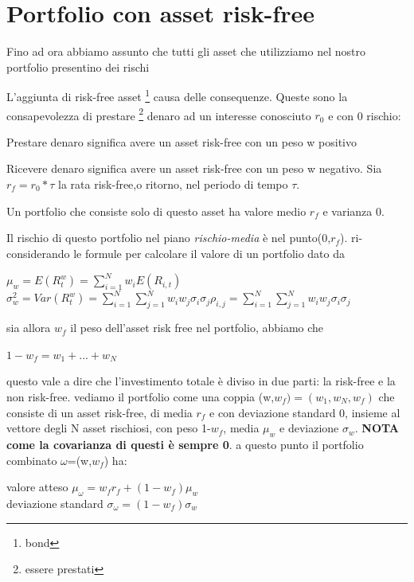 \documentclass[a4paper,11pt]{report}
\begin{document}
{%
\section{Portfolio con asset risk-free}
	Fino ad ora abbiamo assunto che tutti gli asset che utilizziamo nel nostro portfolio presentino dei rischi

	L'aggiunta di risk-free asset \footnote{bond} causa delle consequenze.
	Queste sono la consapevolezza di prestare \footnote{essere prestati} denaro ad un interesse conosciuto $r_0$ e con 0 rischio:
	
	Prestare denaro significa avere un asset risk-free con un peso w positivo

	Ricevere denaro significa avere un asset risk-free con un peso w negativo. \newline
	Sia $r_f=r_0* \tau$ la rata risk-free,o ritorno, nel periodo di tempo $\tau$.

	Un portfolio che consiste solo di questo asset ha valore medio $r_f$ e varianza 0.

	Il rischio di questo portfolio nel piano \emph{rischio-media} è nel punto(0,$r_f$).
	ri-considerando le formule per calcolare il valore di un portfolio dato da
\begin{center}
	$\mu_w = E(R_t^w) =  \sum\limits_{i=1}^N w_i E(R_{i,t}) $ 
	$\sigma_w^2 = Var(R_t^w) =  \sum\limits_{i=1}^N  \sum\limits_{j=1}^N w_i w_j \sigma_i \sigma_j \rho_{i,j} =  \sum		\limits_{i=1}^N  \sum\limits_{j=1}^N w_i w_j \sigma_i \sigma_j  $ 
\end{center}
	sia allora $w_f$ il peso dell'asset risk free nel portfolio, abbiamo che
\begin{center}
$	1-w_f=w_1+...+w_N$
\end{center}
	questo vale a dire che l'investimento totale è diviso in due parti: la risk-free e la non risk-free.
	vediamo il portfolio come una coppia (w,$w_f)=(w_1,w_N,w_f) $ che consiste di un asset risk-free, di media $r_f$
	e con deviazione standard 0, insieme al vettore degli N asset rischiosi, con peso 1-$w_f$, media $\mu_w$ e deviazione $			\sigma_w$. \newline
	\textbf{NOTA come la covarianza di questi è sempre 0}. \newline
	a questo punto il portfolio combinato $\omega$=(w,$w_f$) ha:
\begin{center}
	valore atteso $\mu_\omega = w_f r_f+(1-w_f)\mu_w $ \\
	deviazione standard $\sigma_\omega = (1-w_f) \sigma_w$
\end{center}

}
\end{document}
